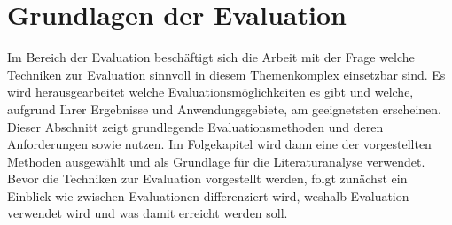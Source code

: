 \documentclass[draft=false
              ,paper=a4
              ,twoside=false
              ,fontsize=11pt
              ,headsepline
              ,BCOR10mm
              ,DIV11
              ]{scrbook}
\begin{document}
\section{Grundlagen der Evaluation} %
\label{sec:grundlagen_der_evaluation}
Im Bereich der Evaluation beschäftigt sich die Arbeit mit der Frage welche Techniken zur Evaluation sinnvoll in diesem Themenkomplex einsetzbar sind. Es wird herausgearbeitet welche Evaluationsmöglichkeiten es gibt und welche, aufgrund Ihrer Ergebnisse und Anwendungsgebiete, am geeignetsten erscheinen. Dieser Abschnitt zeigt grundlegende Evaluationsmethoden und deren Anforderungen sowie nutzen. Im Folgekapitel wird dann eine der vorgestellten Methoden ausgewählt und als Grundlage für die Literaturanalyse verwendet.
Bevor die Techniken zur Evaluation vorgestellt werden, folgt zunächst ein Einblick wie zwischen Evaluationen differenziert wird, weshalb Evaluation verwendet wird und was damit erreicht werden soll.
\end{document}
